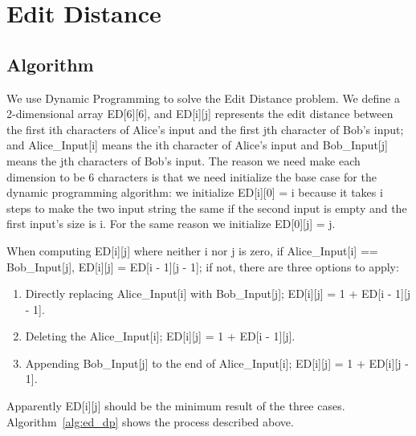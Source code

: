 \section{Edit Distance}

\subsection{Algorithm}
We use Dynamic Programming to solve the Edit Distance problem.
We define a 2-dimensional array ED[6][6], and ED[i][j] represents the edit distance
between the first ith characters of Alice's input and the first jth character
of Bob's input; and Alice\_Input[i] means the ith character of Alice's input
and Bob\_Input[j] means the jth characters of Bob's input.
The reason we need make each dimension to be 6 characters
is that we need initialize the base case for the dynamic programming algorithm:
we initialize ED[i][0] = i because it takes i steps to make the two input
string the same if the second input is empty and the first input's size is i.
For the same reason we initialize ED[0][j] = j.

When computing ED[i][j] where neither i nor j is zero, if
Alice\_Input[i] == Bob\_Input[j], ED[i][j] = ED[i - 1][j - 1];
if not, there are three options to apply:
\begin{enumerate}
    \item Directly replacing Alice\_Input[i] with Bob\_Input[j];
        ED[i][j] = 1 + ED[i - 1][j - 1].
    \item Deleting the Alice\_Input[i]; ED[i][j] = 1 + ED[i - 1][j].
    \item Appending Bob\_Input[j] to the end of Alice\_Input[i];
        ED[i][j] = 1 + ED[i][j - 1].
\end{enumerate}

Apparently ED[i][j] should be the minimum result of the three cases.
Algorithm~\ref{alg:ed_dp} shows the process described above.

